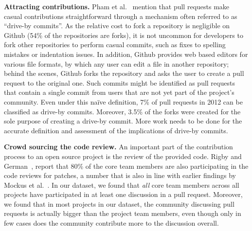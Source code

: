 \documentclass{sig-alternate}
\begin{document}
%
\textbf{Attracting contributions.} Pham et al.~\cite{Pham13} mention
that pull requests make casual contributions straightforward through
a mechanism often referred to as ``drive-by commits''. As the
relative cost to fork a repository is negligible on Github (54\% of the
repositories are forks), it is not uncommon for developers to fork other
repositories to perform casual commits, such as fixes to spelling mistakes or
indentation issues. In addition, Github provides web based editors
for various file formats, by which any user can edit a file in another
repository; behind the scenes, Github forks the repository and asks the user
to create a pull request to the original one. Such commits might be identified
as pull requests that contain a single commit from users that are not yet part
of the project's community. Even under this na\"ive definition, 7\% of pull
requests in 2012 can be classified as drive-by commits. Moreover, 3.5\% of the
forks were created for the sole purpose of creating a drive-by commit. More
work needs to be done for the accurate definition and assessment of the
implications of drive-by commits.

\textbf{Crowd sourcing the code review.}
An important part of the contribution process to an open source project is the
review of the provided code. Rigby and German~\cite{Rigby06},
report that 80\% of the core team members are also participating in the code
reviews for patches, a number that is also in line with earlier findings by
Mockus et al.~\cite{MOCKU02}. In our dataset, we found that \emph{all} core
team members across all projects have participated in at least
one discussion in a pull request. Moreover, we found that in most projects
in our dataset, the community discussing pull requests is actually bigger
than the project team members, even though only in few cases does the community
contribute more to the discussion overall.
\end{document}
